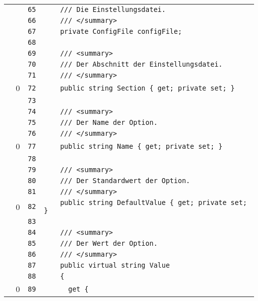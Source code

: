 \documentclass[a4paper,10pt]{article}
\begin{document}
\begin{longtable}[l]{lrrl}
\cellcolor{gray} &  & \verb~65~ & \verb~    /// Die Einstellungsdatei.~\\
\cellcolor{gray} &  & \verb~66~ & \verb~    /// </summary>~\\
\cellcolor{gray} &  & \verb~67~ & \verb~    private ConfigFile configFile;~\\
\cellcolor{gray} &  & \verb~68~ & \verb~~\\
\cellcolor{gray} &  & \verb~69~ & \verb~    /// <summary>~\\
\cellcolor{gray} &  & \verb~70~ & \verb~    /// Der Abschnitt der Einstellungsdatei.~\\
\cellcolor{gray} &  & \verb~71~ & \verb~    /// </summary>~\\
\cellcolor{red} & 0 & \verb~72~ & \verb~    public string Section { get; private set; }~\\
\cellcolor{gray} &  & \verb~73~ & \verb~~\\
\cellcolor{gray} &  & \verb~74~ & \verb~    /// <summary>~\\
\cellcolor{gray} &  & \verb~75~ & \verb~    /// Der Name der Option.~\\
\cellcolor{gray} &  & \verb~76~ & \verb~    /// </summary>~\\
\cellcolor{red} & 0 & \verb~77~ & \verb~    public string Name { get; private set; }~\\
\cellcolor{gray} &  & \verb~78~ & \verb~~\\
\cellcolor{gray} &  & \verb~79~ & \verb~    /// <summary>~\\
\cellcolor{gray} &  & \verb~80~ & \verb~    /// Der Standardwert der Option.~\\
\cellcolor{gray} &  & \verb~81~ & \verb~    /// </summary>~\\
\cellcolor{red} & 0 & \verb~82~ & \verb~    public string DefaultValue { get; private set; }~\\
\cellcolor{gray} &  & \verb~83~ & \verb~~\\
\cellcolor{gray} &  & \verb~84~ & \verb~    /// <summary>~\\
\cellcolor{gray} &  & \verb~85~ & \verb~    /// Der Wert der Option.~\\
\cellcolor{gray} &  & \verb~86~ & \verb~    /// </summary>~\\
\cellcolor{gray} &  & \verb~87~ & \verb~    public virtual string Value~\\
\cellcolor{gray} &  & \verb~88~ & \verb~    {~\\
\cellcolor{red} & 0 & \verb~89~ & \verb~      get {~\\

\end{longtable}
\end{document}
